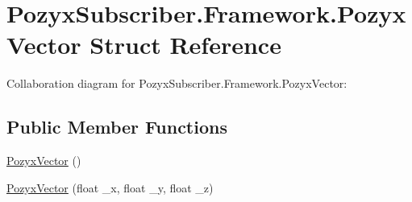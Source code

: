 \hypertarget{struct_pozyx_subscriber_1_1_framework_1_1_pozyx_vector}{}\section{Pozyx\+Subscriber.\+Framework.\+Pozyx\+Vector Struct Reference}
\label{struct_pozyx_subscriber_1_1_framework_1_1_pozyx_vector}


Collaboration diagram for Pozyx\+Subscriber.\+Framework.\+Pozyx\+Vector\+:
\subsection*{Public Member Functions}
\begin{DoxyCompactItemize}
\item 
\hyperlink{struct_pozyx_subscriber_1_1_framework_1_1_pozyx_vector_a9b698d9e83339b4a71856aefdca5e1b6}{Pozyx\+Vector} ()
\item 
\hyperlink{struct_pozyx_subscriber_1_1_framework_1_1_pozyx_vector_ab572bd4a48efe90311b899b86f73fadf}{Pozyx\+Vector} (float \+\_\+x, float \+\_\+y, float \+\_\+z)
\end{DoxyCompactItemize}
